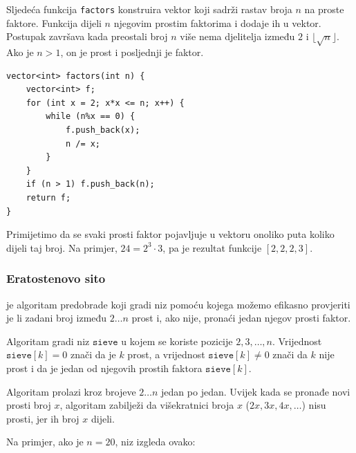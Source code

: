 \noindent
Sljedeća funkcija \texttt{factors}
konstruira vektor koji sadrži rastav
broja $n$ na proste faktore.
Funkcija dijeli $n$ njegovim prostim faktorima
i dodaje ih u vektor.
Postupak završava kada preostali broj $n$
više nema djelitelja između $2$ i $\lfloor \sqrt n \rfloor$.
Ako je $n>1$, on je prost i posljednji je faktor.

\begin{lstlisting}
vector<int> factors(int n) {
    vector<int> f;
    for (int x = 2; x*x <= n; x++) {
        while (n%x == 0) {
            f.push_back(x);
            n /= x;
        }
    }
    if (n > 1) f.push_back(n);
    return f;
}
\end{lstlisting}

Primijetimo da se svaki prosti faktor pojavljuje u vektoru
onoliko puta koliko dijeli taj broj.
Na primjer, $24=2^3 \cdot 3$,
pa je rezultat funkcije $[2,2,2,3]$.

\subsubsection{Eratostenovo sito}


je algoritam predobrade
koji gradi niz pomoću kojega možemo
efikasno provjeriti je li zadani broj između $2 \ldots n$
prost i, ako nije, pronaći jedan njegov prosti faktor.

Algoritam gradi niz $\texttt{sieve}$
u kojem se koriste pozicije $2,3,\ldots,n$.
Vrijednost $\texttt{sieve}[k]=0$ znači
da je $k$ prost,
a vrijednost $\texttt{sieve}[k] \neq 0$
znači da $k$ nije prost i da je jedan
od njegovih prostih faktora $\texttt{sieve}[k]$.

Algoritam prolazi kroz brojeve
$2 \ldots n$ jedan po jedan.
Uvijek kada se pronađe novi prosti broj $x$,
algoritam zabilježi da višekratnici
broja $x$ ($2x,3x,4x,\ldots$) nisu prosti,
jer ih broj $x$ dijeli.

Na primjer, ako je $n=20$, niz izgleda ovako:

